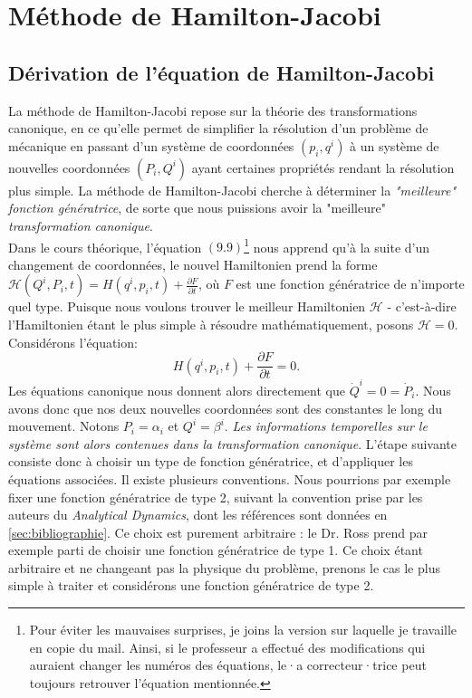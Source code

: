 \documentclass[11pt,oneside,a4paper]{article}
\newcommand{\dif}[2]{\frac{\partial #1}{\partial #2}}
\begin{document}
    \newpage

    \section{Méthode de Hamilton-Jacobi}
    \subsection{Dérivation de l'équation de Hamilton-Jacobi}
    La méthode de Hamilton-Jacobi repose sur la théorie des transformations canonique, en ce qu'elle permet de simplifier la résolution d'un problème de mécanique en passant d'un système de coordonnées $(p_i,q^i)$ à un système de nouvelles coordonnées $(P_i,Q^i)$ ayant certaines propriétés rendant la résolution plus simple. La méthode de Hamilton-Jacobi cherche à déterminer la \emph{"meilleure" fonction génératrice}, de sorte que nous puissions avoir la "meilleure" \emph{transformation canonique}.\\

    Dans le cours théorique, l'équation $(9.9)$\footnote{Pour éviter les mauvaises surprises, je joins la version sur laquelle je travaille en copie du mail. Ainsi, si le professeur a effectué des modifications qui auraient changer les numéros des équations, le·a correcteur·trice peut toujours retrouver l'équation mentionnée.} nous apprend qu'à la suite d'un changement de coordonnées, le nouvel Hamiltonien prend la forme $\mathcal{H}(Q^i,P_i,t) = H(q^i,p_i,t) + \dif{F}{t}$, où $F$ est une fonction génératrice de n'importe quel type. Puisque nous voulons trouver le meilleur Hamiltonien $\mathcal{H}$ - c'est-à-dire l'Hamiltonien étant le plus simple à résoudre mathématiquement, posons $\mathcal{H} = 0$. Considérons l'équation:
    \begin{equation}
        H(q^i,p_i,t) + \dif{F}{t} = 0.\label{eq:HJ to be}
    \end{equation}
    Les équations canonique nous donnent alors directement que $\dot{Q}^i = 0 = \dot{P}_i$. Nous avons donc que nos deux nouvelles coordonnées sont des constantes le long du mouvement. Notons $P_i = \alpha_i$ et $Q^i = \beta^i$. \emph{Les informations temporelles sur le système sont alors contenues dans la transformation canonique}. L'étape suivante consiste donc à choisir un type de fonction génératrice, et d'appliquer les équations associées. Il existe plusieurs conventions. Nous pourrions par exemple fixer une fonction génératrice de type 2, suivant la convention prise par les auteurs du \emph{Analytical Dynamics}, dont les références sont données en \ref{sec:bibliographie}. Ce choix est purement arbitraire : le Dr. Ross prend par exemple parti de choisir une fonction génératrice de type 1. Ce choix étant arbitraire et ne changeant pas la physique du problème, prenons le cas le plus simple à traiter et considérons une fonction génératrice de type 2.
\end{document}
